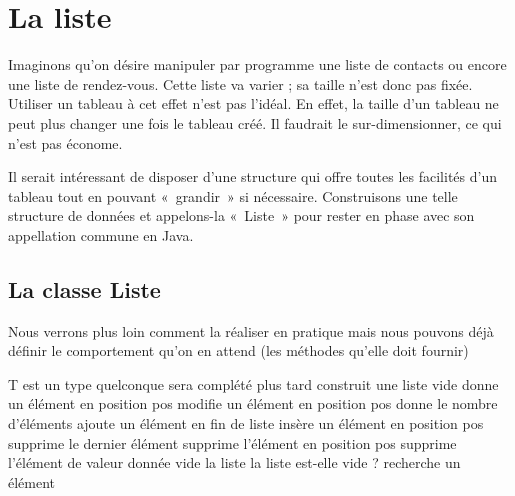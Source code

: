 \chapter{La liste}


Imaginons qu’on désire manipuler par programme une liste de contacts ou
encore une liste de rendez-vous. Cette liste va varier ; sa taille
n’est donc pas fixée. Utiliser un tableau à cet effet n’est pas l’idéal. 
En effet, la taille d’un tableau ne peut plus changer une fois le tableau créé. 
Il faudrait le sur-dimensionner, ce qui n’est pas économe.

Il serait intéressant de disposer d’une structure qui offre toutes les
facilités d’un tableau tout en pouvant «~grandir~» si nécessaire.
Construisons une telle structure de données et appelons-la «~Liste~»
pour rester en phase avec son appellation commune en Java.

\section{La classe Liste}

Nous verrons plus loin comment la réaliser en pratique mais nous pouvons
déjà définir le comportement qu’on en attend (les méthodes qu’elle doit
fournir)

\begin{Pseudocode}
		\RComment T est un type quelconque
		\Private
			\LComment sera complété plus tard	
		\Public
				\RComment construit une liste vide
				\RComment donne un élément en position pos
				\RComment modifie un élément en position pos
				\RComment donne le nombre d’éléments
				\RComment ajoute un élément en fin de liste
				\RComment insère un élément en position pos
				\RComment supprime le dernier élément
				\RComment supprime l'élément en position pos
				\RComment supprime l'élément de valeur donnée
				\RComment vide la liste
				\RComment la liste est-elle vide ?
				\RComment recherche un élément
		\EndClass
\end{Pseudocode}

